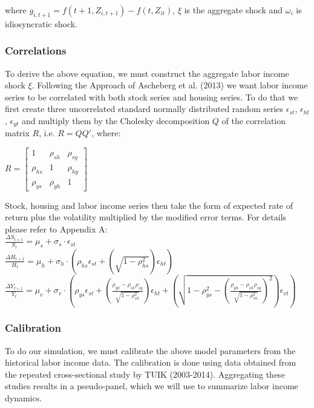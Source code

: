 \documentclass[]{article}
\begin{document}
where $g_{i,t+1} = f(t+1, Z_{i,t+1}) - f(t, Z_{it})$, $\xi$ is the aggregate shock and $\omega_{i}$ is idiosyncratic shock.


\subsubsection{Correlations}

To derive the above equation, we must construct the aggregate labor income shock $\xi$. Following the Approach of Ascheberg et al. (2013) we want labor income series to be correlated with both stock series and housing series. To do that we first create three uncorrelated standard normally distributed random series $\epsilon_{st}$, $\epsilon_{ht}$, $\epsilon_{yt}$ and multiply them by the Cholesky decomposition $Q$ of the correlation matrix $R$, i.e. $R = QQ'$, where:

\begin{center}
	$R = \begin{bmatrix}
					1 & \rho_{sh} & \rho_{sy} \\
					\rho_{hs} & 1 & \rho_{hy} \\
					\rho_{ys} & \rho_{yh} & 1
			\end{bmatrix}
	$
\end{center}

Stock, housing and labor income series then take the form of expected rate of return plus the volatility multiplied by the modified error terms. For details please refer to Appendix A:\\
$\frac{\Delta S_{t+1}}{S_t} = \mu_s + \sigma_s \cdot \epsilon_{st}$\\
$\frac{\Delta H_{t+1}}{H_t} = \mu_h + \sigma_h \cdot \left(\rho_{hs}\epsilon_{st} + (\sqrt{1-\rho^2_{hs}})\epsilon_{ht}\right)$\\
$\frac{\Delta Y_{t+1}}{Y_t} = \mu_v + \sigma_v \cdot \left(\rho_{ys}\epsilon_{st} + \left(\frac{\rho_{yh} - \rho_{sh}\rho_{sy}}{\sqrt{1-\rho^2_{sh}}}\right)\epsilon_{ht} + \left(\sqrt{1-\rho^2_{ys}-(\frac{\rho_{yh} - \rho_{sh}\rho_{sy}}{\sqrt{1-\rho^2_{sh}}})^2}\right)\epsilon_{vt}\right)$


\subsubsection{Calibration}

To do our simulation, we must calibrate the above model parameters from the historical labor income data. The calibration is done using data obtained from the repeated cross-sectional study by TUIK (2003-2014). Aggregating these studies results in a pseudo-panel, which we will use to summarize labor income dynamics.
\end{document}
